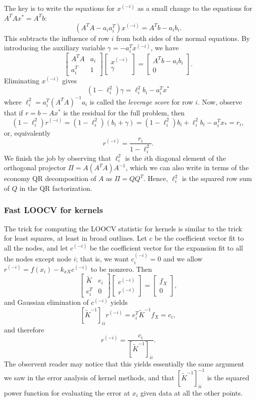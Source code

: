 \documentclass[12pt, leqno]{article} %
\begin{document}
The key is to write the equations for $x^{(-i)}$ as a small change to
the equations for $A^T A x^* = A^T b$:
\[
  (A^T A - a_i a_i^T) x^{(-i)} = A^T b - a_i b_i.
\]
This subtracts the influence of row $i$ from both sides of the normal
equations.  By introducing the auxiliary variable $\gamma = -a_i^T x^{(-i)}$,
we have
\[
  \begin{bmatrix}
    A^TA & a_i \\
    a_i^T & 1
  \end{bmatrix}
  \begin{bmatrix} x^{(-i)} \\ \gamma \end{bmatrix} =
  \begin{bmatrix} A^T b - a_i b_i \\ 0 \end{bmatrix}.
\]
Eliminating $x^{(-i)}$ gives
\[
  (1-\ell_i^2) \gamma = \ell_i^2 b_i - a_i^T x^*
\]
where $\ell_i^2 = a_i^T (A^T A)^{-1} a_i$ is called the
{\em leverage score} for row $i$.  Now, observe that
if $r = b-Ax^*$ is the residual for the full problem, then
\[
(1-\ell_i^2) r^{(-i)}
  = (1-\ell_i^2) (b_i + \gamma)
  = (1-\ell_i^2) b_i + \ell_i^2 b_i - a_i^T x_*
  = r_i,
\]
or, equivalently
\[
  r^{(-i)} = \frac{r_i}{1-\ell_i^2}.
\]
We finish the job by observing that $\ell_i^2$ is the $i$th diagonal
element of the orthogonal projector $\Pi = A(A^TA)A^{-1}$, which we
can also write in terms of the economy QR decomposition of $A$ as
$\Pi = QQ^T$.  Hence, $\ell_i^2$ is the squared row sum of $Q$ in
the QR factorization.

\subsubsection{Fast LOOCV for kernels}

The trick for computing the LOOCV statistic for kernels is similar to
the trick for least squares, at least in broad outlines.  Let $c$ be
the coefficient vector fit to all the nodes, and let $c^{(-i)}$ be the
coefficient vector for the expansion fit to all the nodes except node
$i$; that is, we want $c^{(-i)}_i = 0$ and we allow $r^{(-i)} = f(x_i)
- k_{xX} c^{(-i)}$ to be nonzero.  Then
\[
  \begin{bmatrix} \tilde{K} & e_i \\ e_i^T & 0 \end{bmatrix}
  \begin{bmatrix} c^{(-i)} \\ r^{(-i)} \end{bmatrix} =
  \begin{bmatrix} f_X \\ 0 \end{bmatrix},
\]
and Gaussian elimination of $c^{(-i)}$ yields
\[
  [\tilde{K}^{-1}]_{ii} r^{(-i)} = e_i^T \tilde{K}^{-1} f_X = c_i,
\]
and therefore
\[
  r^{(-i)} = \frac{c_i}{[\tilde{K}^{-1}]_{ii}}.
\]
The observent reader may notice that this yields essentially the same
argument we saw in the error analysis of kernel methods, and that
$[\tilde{K}^{-1}]_{ii}^{-1}$ is the squared power function for
evaluating the error at $x_i$ given data at all the other points.
\end{document}
